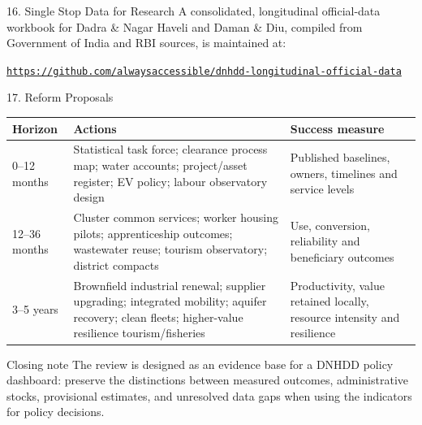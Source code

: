 \documentclass[aspectratio=169,11pt]{beamer}
\renewcommand{\arraystretch}{1.12}
\begin{document}
\begin{frame}{16. Single Stop Data for Research}
A consolidated, longitudinal official-data workbook for Dadra \& Nagar Haveli and Daman \& Diu, compiled from Government of India and RBI sources, is maintained at:
\begin{center}
\vspace{0.35em}
\href{https://github.com/alwaysaccessible/dnhdd-longitudinal-official-data}{\fontsize{40}{44}\selectfont \faGithub}
\par\vspace{0.45em}
\href{https://github.com/alwaysaccessible/dnhdd-longitudinal-official-data}{\nolinkurl{https://github.com/alwaysaccessible/dnhdd-longitudinal-official-data}}
\end{center}
\end{frame}

\begin{frame}{17. Reform Proposals}\tiny\setlength{\tabcolsep}{2pt}\renewcommand{\arraystretch}{1.13}
\begin{tabularx}{\textwidth}{p{}p{}Y}\toprule Horizon & Actions & Success measure\\--12 months & Statistical task force; clearance process map; water accounts; project/asset register; EV policy; labour observatory design & Published baselines, owners, timelines and service levels\\
12--36 months & Cluster common services; worker housing pilots; apprenticeship outcomes; wastewater reuse; tourism observatory; district compacts & Use, conversion, reliability and beneficiary outcomes\\
3--5 years & Brownfield industrial renewal; supplier upgrading; integrated mobility; aquifer recovery; clean fleets; higher-value resilience tourism/fisheries & Productivity, value retained locally, resource intensity and resilience\\
\bottomrule\end{tabularx}
\end{frame}

\begin{frame}{Closing note}
The review is designed as an evidence base for a DNHDD policy dashboard: preserve the distinctions between measured outcomes, administrative stocks, provisional estimates, and unresolved data gaps when using the indicators for policy decisions.
\end{frame}
\end{document}
